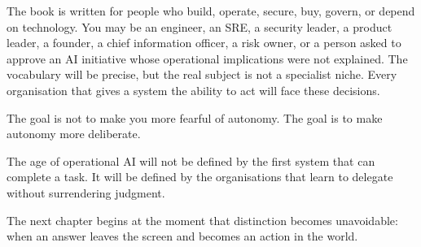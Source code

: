 The book is written for people who build, operate, secure, buy, govern,
or depend on technology. You may be an engineer, an SRE, a security
leader, a product leader, a founder, a chief information officer, a risk
owner, or a person asked to approve an AI initiative whose operational
implications were not explained. The vocabulary will be precise, but the
real subject is not a specialist niche. Every organisation that gives a
system the ability to act will face these decisions.

The goal is not to make you more fearful of autonomy. The goal is to
make autonomy more deliberate.

The age of operational AI will not be defined by the first system that
can complete a task. It will be defined by the organisations that learn
to delegate without surrendering judgment.

The next chapter begins at the moment that distinction becomes
unavoidable: when an answer leaves the screen and becomes an action in
the world.
